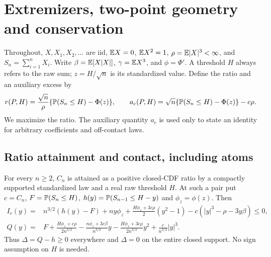 \section{Extremizers, two-point geometry and conservation}\label{j:core:section}
Throughout, $X,X_1,X_2,\ldots$ are iid, $\mathbb E X=0$, $\mathbb E X^2=1$,
$\rho=\mathbb E|X|^3<\infty$, and $S_n=\sum_{i=1}^nX_i$. Write
$\beta=\mathbb E[X|X|]$, $\gamma=\mathbb E X^3$, and $\phi=\Phi'$.
A threshold $H$ always refers to the raw sum; $z=H/\sqrt n$ is its
standardized value. Define the ratio and an auxiliary excess by
\[
 r(P,H)=\frac{\sqrt n}{\rho}\{\mathbb P(S_n\le H)-\Phi(z)\},\qquad
 a_c(P,H)=\sqrt n\{\mathbb P(S_n\le H)-\Phi(z)\}-c\rho.
\]
We maximize the ratio. The auxiliary quantity $a_c$ is used only to
state an identity for arbitrary coefficients and off-contact laws.

\subsection{Ratio attainment and contact, including atoms}
\begin{theorem}\label{j:core:attainment}
For every $n\ge2$, $C_n$ is attained as a positive closed-CDF ratio by
a compactly supported standardized law and a real raw threshold $H$.
At such a pair put $c=C_n$, $F=\mathbb P(S_n\le H)$,
$h(y)=\mathbb P(S_{n-1}\le H-y)$ and $\phi_z=\phi(z)$. Then
\begin{align}
 I_c(y)={}&n^{3/2}(h(y)-F)+ny\phi_z
 +\frac{H\phi_z+3c\rho}{2}(y^2-1)
 -c(|y|^3-\rho-3y\beta)\le0,\label{j:core:contact}\\
 Q(y)={}&F+\frac{H\phi_z+c\rho}{2n^{3/2}}
 -\frac{n\phi_z+3c\beta}{n^{3/2}}y
 -\frac{H\phi_z+3c\rho}{2n^{3/2}}y^2
 +\frac{c}{n^{3/2}}|y|^3.\label{j:core:Q}
\end{align}
Thus $\Delta=Q-h\ge0$ everywhere and $\Delta=0$ on the entire closed
support. No sign assumption on $H$ is needed.
\end{theorem}
